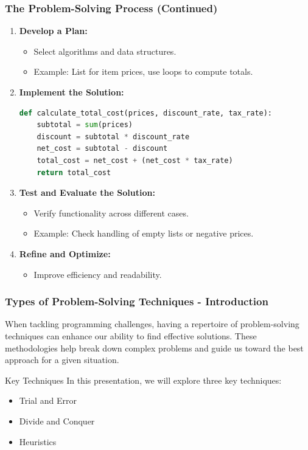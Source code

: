 \documentclass{beamer}
\begin{document}
\begin{frame}[fragile]
    \frametitle{The Problem-Solving Process (Continued)}
    \begin{enumerate}[resume]
        \item \textbf{Develop a Plan:}
            \begin{itemize}
                \item Select algorithms and data structures.
                \item Example: List for item prices, use loops to compute totals.
            \end{itemize}

        \item \textbf{Implement the Solution:}
            \begin{lstlisting}[language=Python]
def calculate_total_cost(prices, discount_rate, tax_rate):
    subtotal = sum(prices)
    discount = subtotal * discount_rate
    net_cost = subtotal - discount
    total_cost = net_cost + (net_cost * tax_rate)
    return total_cost
            \end{lstlisting}
        \item \textbf{Test and Evaluate the Solution:}
            \begin{itemize}
                \item Verify functionality across different cases.
                \item Example: Check handling of empty lists or negative prices.
            \end{itemize}

        \item \textbf{Refine and Optimize:}
            \begin{itemize}
                \item Improve efficiency and readability.
            \end{itemize}
    \end{enumerate}
\end{frame}

\begin{frame}[fragile]
    \frametitle{Types of Problem-Solving Techniques - Introduction}
    When tackling programming challenges, having a repertoire of problem-solving techniques can enhance our ability to find effective solutions. These methodologies help break down complex problems and guide us toward the best approach for a given situation.
    
    \begin{block}{Key Techniques}
        In this presentation, we will explore three key techniques:
        \begin{itemize}
            \item Trial and Error
            \item Divide and Conquer
            \item Heuristics
        \end{itemize}
    \end{block}
\end{frame}
\end{document}
